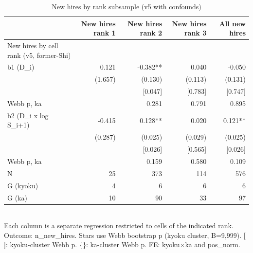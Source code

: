 \begin{table}[!htbp]
  \centering
  \caption{New hires by rank subsample (v5 with confounds)}
  \label{tab:v5_new_hires_rank}
  \begin{tabular}{lrrrr}
    \hline\hline
     & New hires rank 1 & New hires rank 2 & New hires rank 3 & All new hires \\
    \hline
    New hires by cell rank (v5, former-Shi) &  &  &  &  \\
    b1 (D_i) & 0.121 & -0.382** & 0.040 & -0.050 \\
     & (1.657) & (0.130) & (0.113) & (0.131) \\
    [Webb p, kyoku] &  & [0.047] & [0.783] & [0.747] \\
    {Webb p, ka} &  & {0.281} & {0.791} & {0.895} \\
    b2 (D_i x log S_i+1) & -0.415 & 0.128** & 0.020 & 0.121** \\
     & (0.287) & (0.025) & (0.029) & (0.025) \\
    [Webb p, kyoku] &  & [0.026] & [0.565] & [0.026] \\
    {Webb p, ka} &  & {0.159} & {0.580} & {0.109} \\
    \hline
    N & 25 & 373 & 114 & 576 \\
    G (kyoku) & 4 & 6 & 6 & 6 \\
    G (ka) & 10 & 90 & 33 & 97 \\
    \hline\hline
  \end{tabular}
  \\[4pt]
  \footnotesize Each column is a separate regression restricted to cells of the indicated rank. Outcome: n\_new\_hires. Stars use Webb bootstrap p (kyoku cluster, B=9,999). [ ]: kyoku-cluster Webb p. \{\}: ka-cluster Webb p. FE: kyoku$\times$ka and pos\_norm.
\end{table}

